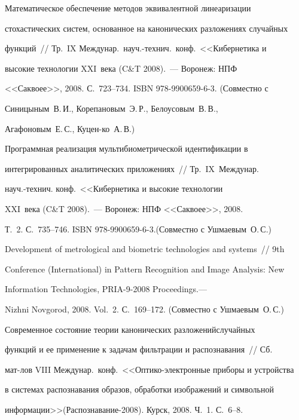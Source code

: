  Математическое обеспечение методов эквивалентной линеаризации


стохастических систем, основанное на канонических разложениях случайных


функций~// Тр.\ IX Междунар.\ науч.-технич.\ конф.\ <<Кибернетика и


высокие технологии XXI~века (C\&T 2008).~--- Воронеж: НПФ


<<Саквоее>>, 2008. С.~723--734. ISBN 978-9900659-6-3. (Совместно с


Синицыным~В.\,И., Корепановым~Э.\,Р., Белоусовым~В.\,В.,


Агафоновым~Е.\,С., Ку\-цен-\linebreak ко~А.\,В.)





 Программная реализация мультибиометрической идентификации в


интегрированных аналитических приложениях~// Тр.\ IX~Междунар.\


 науч.-технич. конф.\ <<Кибернетика и высокие технологии


XXI~века (C\&T 2008).~--- Воронеж: НПФ <<Саквоее>>, 2008.


Т.~2. С.~735--746. ISBN 978-9900659-6-3.(Совместно с Ушмаевым~О.\,С.)





 Development of metrological and biometric technologies and systems~// 9th


 Conference (International) in Pattern Recognition and Image Analysis: New


Information Technologies, PRIA-9-2008 Pro\-ceed\-ings.---


Nizhni Novgorod, 2008. Vol.~2. С.~169--172. (Совместно с Ушмаевым~О.\,С.)





Современное состояние теории канонических разложений\linebreak случайных


функций и ее применение к задачам фильтрации и распознавания~// Сб.\


мат-лов VIII Междунар.\ конф.\ <<Оптико-электронные приборы и устройства


в системах распознавания образов, обработки изображений и символьной


информации>>\linebreak (Рас\-по\-зна\-ва\-ние-2008). Курск, 2008. Ч.~1. С.~6--8.


